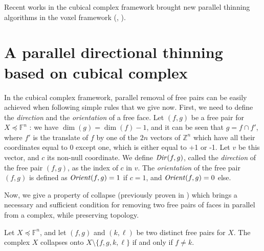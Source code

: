 \documentclass[final,envcountsame]{llncs}
\def\myem#1{{\em #1}}
\def\Zset{\Z}
\def\Z{\mathbb{Z}}
\def\allfaces#1{\mathbb{F}^{#1}}
\def\subcomplex#1#2{#1 \preceq #2}
\def\complex#1#2{\subcomplex{#2}{\allfaces{#1}}}
\def\mydim#1{\dim(#1)}
\def\type#1{\mbox{\it{}Dir\/}(#1)}
\def\orient#1{\mbox{\it{}Orient\/}(#1)}
\def\inter{\cap}
\def\finproof{\square}
\begin{document}
Recent works in the cubical complex framework brought new parallel thinning algorithms in the voxel framework (\cite{BertrandCouprie06}, \cite{Ber07}).

\section{A parallel directional thinning based on cubical complex}
\label{sec::skeletonization}

In the cubical complex framework, parallel removal of free pairs can be easily achieved when following simple rules that we give now. First, we need to define the \myem{direction} and the \myem{orientation} of a free face.
Let $(f,g)$ be a free pair for $\complex{n}{X}$ : we have $\mydim{g} = \mydim{f}-1$, and it can be seen that $g = f \inter f'$, where $f'$ is the translate of $f$ by one of the $2n$ vectors of $\Zset^n$ which have all their coordinates equal to 0 except one, which is either equal to +1 or -1. Let $v$ be this vector, and $c$ its non-null coordinate. We define $\type{f,g}$, called the \myem{direction} of the free pair $(f,g)$, as the index of $c$ in $v$. The \myem{orientation} of the free pair $(f,g)$ is defined as $\orient{f,g}=1$ if $c=1$, and $\orient{f,g}=0$ else.


Now, we give a property of collapse (previously proven in \cite{ChauCou2009}) which brings a necessary and sufficient condition for removing two free pairs of faces in parallel from a complex, while preserving topology.

\begin{proposition}
\label{prop:collpar2}
Let $\complex{n}{X}$, and let $(f,g)$ and $(k,\ell)$ be two distinct free pairs for $X$. The complex $X$ collapses onto $X \setminus \{f,g,k,\ell\}$ if and only if $f \neq k$. 
\end{proposition}

\end{document}
